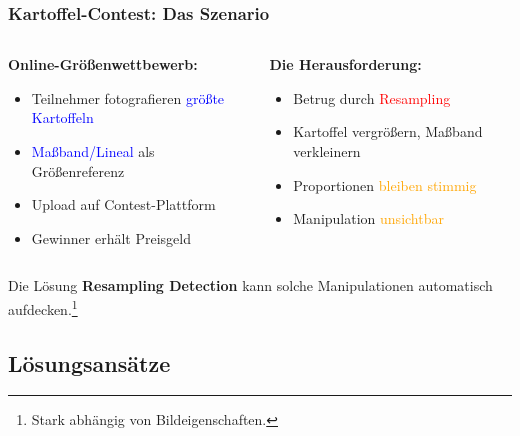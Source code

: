 \documentclass[11pt,t,usepdftitle=false,aspectratio=169]{beamer}
\begin{document}
\begin{frame}
	\frametitle{Kartoffel-Contest: Das Szenario}
	\begin{columns}[T]
		\begin{column}{0.48\textwidth}
			\textbf{Online-Größenwettbewerb:}
			\begin{itemize}
				\item Teilnehmer fotografieren \textcolor{blue}{größte Kartoffeln}
				\item \textcolor{blue}{Maßband/Lineal} als Größenreferenz
				\item Upload auf Contest-Plattform
				\item Gewinner erhält Preisgeld
			\end{itemize}
		\end{column}
		\begin{column}{0.48\textwidth}
			\textbf{Die Herausforderung:}
			\begin{itemize}
				\item Betrug durch \textcolor{red}{Resampling}
				\item Kartoffel vergrößern, Maßband verkleinern
				\item Proportionen \textcolor{orange}{bleiben stimmig}
				\item Manipulation \textcolor{orange}{unsichtbar}
			\end{itemize}
		\end{column}
	\end{columns}
	
	\vspace{1.5em}
	\begin{alertblock}{Die Lösung}
		\textbf{Resampling Detection} kann solche Manipulationen automatisch aufdecken.\footnote{Stark abhängig von Bildeigenschaften.}
	\end{alertblock}
\end{frame}


\subsection{Lösungsansätze}
\end{document}
